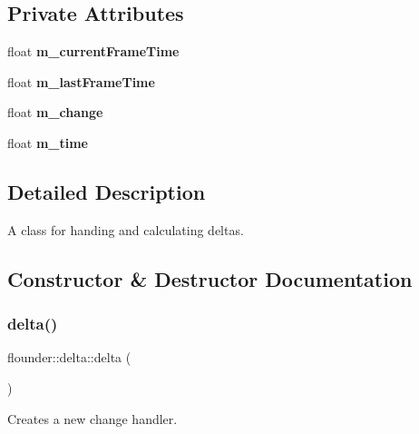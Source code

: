 \subsection*{Private Attributes}
\begin{DoxyCompactItemize}
\item 
\mbox{\label{classflounder_1_1delta_acb0bc7ee712e050a8b9d5974bc5d5e2a}} 
float {\bfseries m\+\_\+current\+Frame\+Time}
\item 
\mbox{\label{classflounder_1_1delta_a36a3f21ac4ec4c3c2216fc8df280e708}} 
float {\bfseries m\+\_\+last\+Frame\+Time}
\item 
\mbox{\label{classflounder_1_1delta_a3dea092447bed123f16b7f8a3545e828}} 
float {\bfseries m\+\_\+change}
\item 
\mbox{\label{classflounder_1_1delta_aeb8c04e49b5dd6244bd3fe97736cb468}} 
float {\bfseries m\+\_\+time}
\end{DoxyCompactItemize}


\subsection{Detailed Description}
A class for handing and calculating deltas. 



\subsection{Constructor \& Destructor Documentation}
\mbox{\label{classflounder_1_1delta_a6996799d2f9423e994e2beb84dc3ba09}} 
\subsubsection{\texorpdfstring{delta()}{delta()}}
{\footnotesize\ttfamily flounder\+::delta\+::delta (\begin{DoxyParamCaption}{ }\end{DoxyParamCaption})}



Creates a new change handler. 

